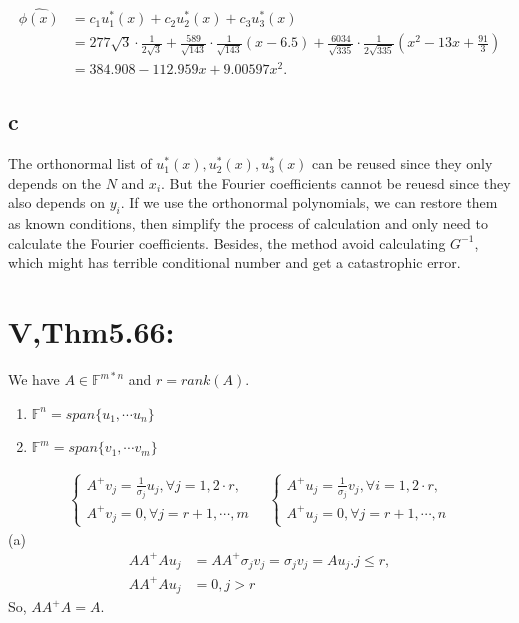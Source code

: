 \documentclass[a4paper]{article}
\begin{document}
\begin{align*}
  \hat{\phi(x)} & = c_1u_1^*(x)+c_2u_2^*(x)+c_3u_3^*(x) \\
  & = 277\sqrt{3} \cdot \frac{1}{2\sqrt{3}} + \frac{589}{\sqrt{143}} \cdot \frac{1}{\sqrt{143}}(x-6.5) + \frac{6034}{\sqrt{335}} \cdot \frac{1}{2\sqrt{335}}(x^2-13x+\frac{91}{3}) \\
  & = 384.908 -112.959x+ 9.00597x^2.
\end{align*}

\subsection*{c}
The orthonormal list of $u^*_1(x), u^*_2(x), u^*_3(x)$ can be reused since they only 
depends on the $N$ and $x_i$. But the Fourier coefficients cannot be reuesd since they 
also depends on $y_i$. If we use the orthonormal polynomials, we can restore them as 
known conditions, then simplify the process of calculation and only need to calculate 
the Fourier coefficients. Besides, the method avoid calculating $G^{-1}$, which might has 
terrible conditional number and get a catastrophic error.

\section*{V,Thm5.66:}
We have $A \in \mathbb{F}^{m * n}$ and $r = rank(A)$.
\begin{enumerate}
  \item $\mathbb{F}^n = span\{u_1, \cdots u_n\}$
  \item $\mathbb{F}^m = span\{v_1, \cdots v_m\}$
\end{enumerate}
\begin{align*}
  \left\{
  \begin{array}{l}
  A^{+}v_j = \frac{1}{\sigma_j}u_j, \forall j = 1, 2 \cdot r,\\
  A^{+}v_j = 0, \forall j = r+1, \cdots, m
  \end{array}
  \right.
  \quad
  \left\{
  \begin{array}{l}
    A^{+}u_j = \frac{1}{\sigma_j}v_j, \forall i = 1, 2 \cdot r,\\
    A^{+}u_j = 0, \forall j = r+1, \cdots, n
  \end{array}
  \right.
\end{align*}
\noindent (a) 
\begin{align*}
  AA^{+}Au_j & = AA^{+}\sigma_jv_j = \sigma_jv_j = Au_j.j\leqslant r ,\\
  AA^{+}Au_j & = 0, j > r
\end{align*} 
So, $AA^{+}A = A$.
\end{document}
